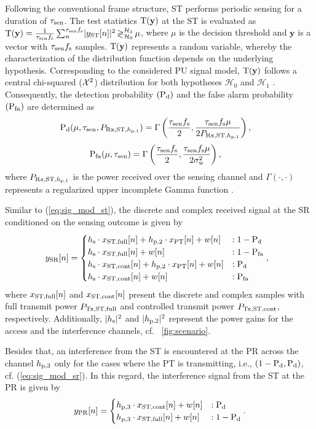 Following the conventional frame structure, ST performs periodic sensing for a duration of $\tau_{\text{sen}}$. The test statistics $\operatorname*{\text{T}(\textbf{y})}$ at the ST is evaluated as $\operatorname*{\text{T}(\textbf{y})} = {\frac{1}{{\tau_{\text{sen}} f_{\text{s}}}}\sum_n^{\tau_{\text{sen}} f_{\text{s}}}} { |y_{\text{ST}}[n]|^2} \mathop{\gtrless}_{\mathcal{H}_0}^{\mathcal{H}_1} \mu$, where $\mu$ is the decision threshold and $\textbf{y}$ is a vector with $\tau_{\text{sen}} f_{\text{s}}$ samples. $\operatorname*{\text{T}(\textbf{y})}$ represents a random variable, whereby the characterization of the distribution function depends on the underlying hypothesis. Corresponding to the considered PU signal model, $\operatorname*{\text{T}(\textbf{y})}$ follows a central chi-squared ($\cchi2$) distribution for both hypotheses $\mathcal H_0$ and $\mathcal H_1$ \cite{Kay}.
Consequently, the detection probability $(\text{P}_{\text{d}})$ and the false alarm probability $(\text{P}_{\text{fa}})$ are determined as \cite{Tan08}
\begin{align}
\text{P}_{\text{d}}(\mu, \tau_{\text{sen}}, P_{\text{Rx,ST,$h_{\text{p,1}}$}}) &= \Gamma\left( \frac{\tau_{\text{sen}} f_{\text{s}}}{2}, \frac{\tau_{\text{sen}} f_{\text{s}} \mu}{2 P_{\text{Rx,ST,$h_{\text{p,1}}$}}} \right),  \label{eq:pd} 
\end{align}
\begin{align}
\text{P}_{\text{fa}}(\mu, \tau_{\text{sen}}) &= \Gamma\left( \frac{\tau_{\text{sen}} f_{\text{s}}}{2}, \frac{\tau_{\text{sen}} f_{\text{s}} \mu}{2 \sigma^2_{\text{w}}} \right),  \label{eq:pfa} 
\end{align}
where $P_{\text{Rx,ST,$h_{\text{p,1}}$}}$ is the power received over the sensing channel and $\Gamma(\cdot, \cdot)$ represents a regularized upper incomplete Gamma function \cite{grad}.

Similar to (\ref{eq:sig_mod_st}), the discrete and complex received signal at the SR conditioned on the sensing outcome is given by 
\begin{equation}
\hspace{-2.3mm}
\ys[n] = 
\begin{cases}
\hs \cdot \xsfull[n] + \hptw \cdot \xp[n] + w[n] &: 1 - \pd \\
\hs \cdot \xsfull[n] + w[n] &: 1 - \pfa \\
\hs \cdot \xscont[n] + \hptw \cdot \xp[n] + w[n] &: \pd \\
\hs \cdot \xscont[n] + w[n] &: \pfa 
\end{cases},
\label{eq:sig_mod_sr}
\end{equation}
where $x_{\text{ST,full}}[n]$ and $x_{\text{ST,cont}}[n]$ present the discrete and complex samples with full transmit power $P_{\text{Tx,ST,full}}$ and controlled transmit power $P_{\text{Tx,ST,cont}}$, respectively. Additionally, $|h_{\text{s}}|^2$ and $|h_{\text{p,2}}|^2$ represent the power gains for the access and the interference channels, cf. \figurename~\ref{fig:scenario}. 


Besides that, an interference from the ST is encountered at the PR across the channel $h_{\text{p,3}}$ only for the cases where the PT is transmitting, i.e., $(1 - \text{P}_{\text{d}}, \text{P}_{\text{d}})$, cf. (\ref{eq:sig_mod_sr}). In this regard, the interference signal from the ST at the PR is given by
\begin{equation}
y_{\text{PR}}[n] = 
\begin{cases}
h_{\text{p,3}} \cdot x_{\text{ST,cont}}[n] + w[n] & : \text{P}_{\text{d}} \\
h_{\text{p,3}} \cdot x_{\text{ST,full}}[n] + w[n] & : 1- \text{P}_{\text{d}} 
\end{cases}.
\label{eq:sig_mod_pr}
\end{equation}

